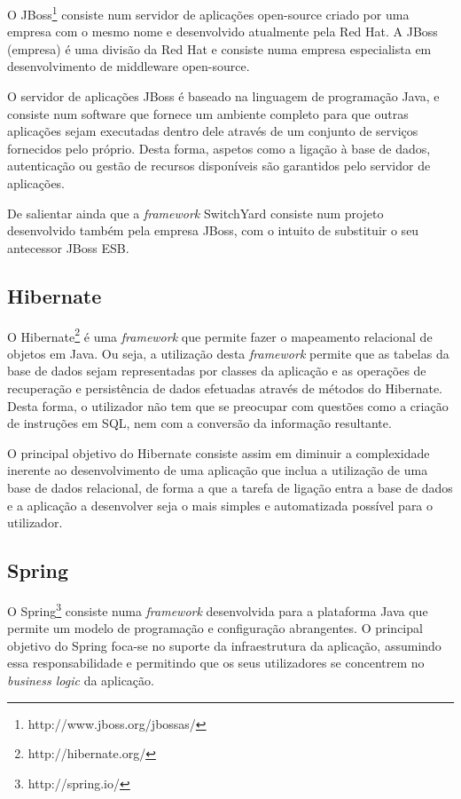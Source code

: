 O JBoss\footnote{http://www.jboss.org/jbossas/} consiste num servidor de aplicações open-source criado por uma empresa com o mesmo nome e desenvolvido atualmente pela Red Hat. A JBoss (empresa) é uma divisão da Red Hat e consiste numa empresa especialista em desenvolvimento de middleware open-source.

O servidor de aplicações JBoss é baseado na linguagem de programação Java, e consiste num software que fornece um ambiente completo para que outras aplicações sejam executadas dentro dele através de um conjunto de serviços fornecidos pelo próprio. Desta forma, aspetos como a ligação à base de dados, autenticação ou gestão de recursos disponíveis são garantidos pelo servidor de aplicações. 

De salientar ainda que a \textit{framework} SwitchYard consiste num projeto desenvolvido também pela empresa JBoss, com o intuito de substituir o seu antecessor JBoss ESB.

\subsection{Hibernate }

O Hibernate\footnote{http://hibernate.org/} é uma \textit{framework} que permite fazer o mapeamento relacional de objetos em Java. Ou seja, a utilização desta \textit{framework} permite que as tabelas da base de dados sejam representadas por classes da aplicação e as operações de recuperação e persistência de dados efetuadas através de métodos do Hibernate. Desta forma, o utilizador não tem que se preocupar com questões como a criação de instruções em SQL, nem com a conversão da informação resultante.

O principal objetivo do Hibernate consiste assim em diminuir a complexidade inerente ao desenvolvimento de uma aplicação que inclua a utilização de uma base de dados relacional, de forma a que a tarefa de ligação entra a base de dados e a aplicação a desenvolver seja o mais simples e automatizada possível para o utilizador.


\subsection{Spring}

O Spring\footnote{http://spring.io/} consiste numa \textit{framework} desenvolvida para a plataforma Java que permite um modelo de programação e configuração abrangentes. O principal objetivo do Spring foca-se no suporte da infraestrutura da aplicação, assumindo essa responsabilidade e permitindo que os seus utilizadores se concentrem no \textit{business logic} da aplicação.

